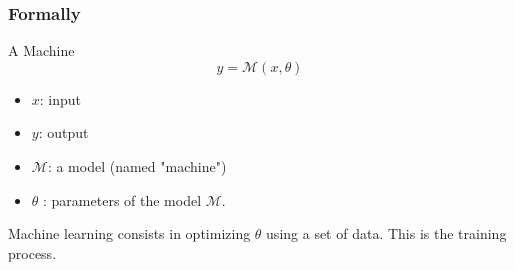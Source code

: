 \documentclass[handout]{beamer}
\begin{document}
\begin{frame}
\frametitle{Formally}
\begin{block}{A Machine}
\begin{equation*}
y = \mathcal{M}(x,\theta)
\end{equation*}
\begin{itemize}
\item $x$: input
\item $y$: output
\item $\mathcal{M}$: a model (named "machine")
\item $\theta$ : parameters of the model $\mathcal{M}$.
\end{itemize}
\end{block}
\alert{Machine learning} consists in optimizing $\theta$ using a set of data. 
This is the training process.
\end{frame}
\end{document}
